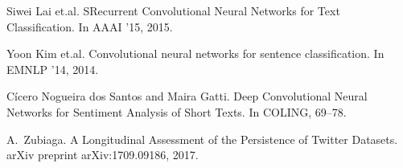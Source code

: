 \documentclass[runningheads]{llncs}
\begin{document}
\begin{thebibliography}{8}
Siwei Lai et.al.
\newblock SRecurrent Convolutional Neural Networks for Text Classification.
\newblock In AAAI ’15, 2015.

Yoon Kim et.al.
\newblock Convolutional neural networks for sentence classification.
\newblock In EMNLP ’14, 2014.

Cícero Nogueira dos Santos and Maira Gatti.
\newblock Deep Convolutional Neural Networks for Sentiment Analysis of Short Texts.
\newblock In COLING, 69–78.

A.~Zubiaga.
\newblock A Longitudinal Assessment of the Persistence of Twitter Datasets.
\newblock arXiv preprint arXiv:1709.09186, 2017.

\end{thebibliography}
\end{document}
